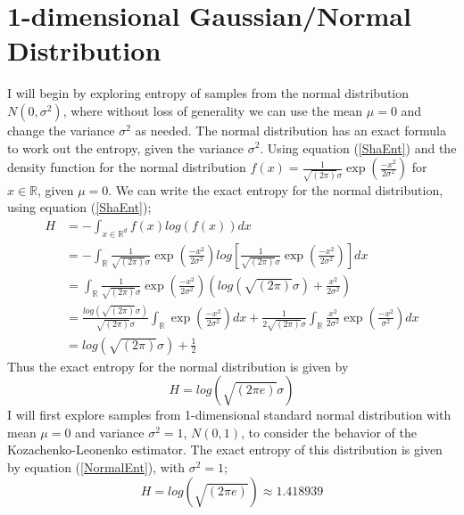 \documentclass{report}
\begin{document}
\section{1-dimensional Gaussian/Normal Distribution} \label{Normal_d=1}

I will begin by exploring entropy of samples from the normal distribution $N(0, \sigma^2)$, where without loss of generality we can use the mean $\mu = 0$ and change the variance $\sigma^2$ as needed. The normal distribution has an exact formula to work out the entropy, given the variance $\sigma^2$. Using equation (\ref{ShaEnt}) and the density function for the normal distribution $f(x) = \frac{1}{\sqrt{(2\pi)} \sigma}\exp{ \left( \frac{-x^2}{2\sigma^2} \right)}$ for $x \in \mathbb{R}$, given $\mu = 0$. We can write the exact entropy for the normal distribution, using equation (\ref{ShaEnt});
\begin{align}
H &= - \int_{x \in \mathbb{R}^d} f(x) log(f(x)) dx \nonumber \\
&= - \int_{\mathbb{R}} \frac{1}{\sqrt{(2\pi)} \sigma}\exp{ \left( \frac{-x^2}{2\sigma^2} \right)} log \left[\frac{1}{\sqrt{(2\pi)} \sigma}\exp{ \left( \frac{-x^2}{2\sigma^2} \right)} \right] dx \nonumber \\
&=  \int_{\mathbb{R}} \frac{1}{\sqrt{(2\pi)} \sigma}\exp{ \left( \frac{-x^2}{2\sigma^2} \right)} \left( log(\sqrt{(2\pi)}\sigma) +  \frac{x^2}{2\sigma^2} \right) \nonumber \\
&= \frac{log(\sqrt{(2\pi)}\sigma)}{\sqrt{(2\pi)} \sigma} \int_{\mathbb{R}} \exp{ \left( \frac{-x^2}{2\sigma^2} \right)} dx +  \frac{1}{2\sqrt{(2\pi)} \sigma} \int_{\mathbb{R}} \frac{x^2}{2\sigma^2}  \exp{ \left( \frac{-x^2}{\sigma^2} \right)} dx \nonumber \\
&=  log(\sqrt{(2\pi)}\sigma) + \frac{1}{2} \nonumber 
\end{align}
Thus the exact entropy for the normal distribution is given by 
\begin{equation}\label{NormalEnt}
H =  log(\sqrt{(2\pi e)}\sigma) 
\end{equation}
I will first explore samples from 1-dimensional standard normal distribution with mean $\mu = 0$ and variance $\sigma^2 = 1$, $N(0, 1)$, to consider the behavior of the Kozachenko-Leonenko estimator. The exact entropy of this distribution is given by equation (\ref{NormalEnt}), with $\sigma^2=1$;
\begin{equation} \label{normal_exact}
H = log(\sqrt{(2\pi e)}) \approx 1.418939
\end{equation}
\end{document}

